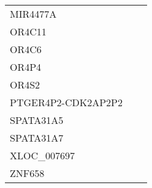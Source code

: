 \begin{tabular}{lcc}
MIR4477A           &    &         \\
OR4C11             &    &         \\
OR4C6              &    &         \\
OR4P4              &    &         \\
OR4S2              &    &         \\
PTGER4P2-CDK2AP2P2 &    &         \\
SPATA31A5          &    &         \\
SPATA31A7          &    &         \\
XLOC\_007697        &    &         \\
ZNF658             &    &         \\
\bottomrule
\end{tabular}
